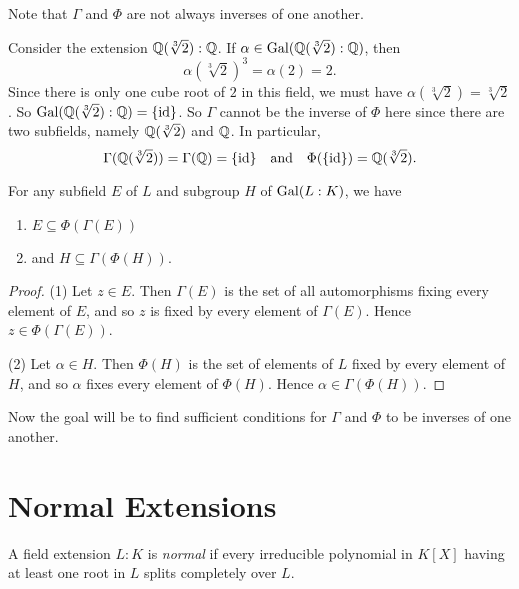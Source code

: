 \begin{remark}
  Note that $\Gamma$ and $\Phi$ are not always
  inverses of one another.
\end{remark}

\begin{example}
  Consider the extension $\mathbb{Q}(\sqrt[3]{2}) : \mathbb{Q}$.
  If $\alpha \in \operatorname{Gal}(\mathbb{Q}(\sqrt[3]{2}) : \mathbb{Q})$, then
  \[
    \alpha(\sqrt[3]{2})^3 = \alpha(2) = 2.
  \]
  Since there is only one cube root of $2$ in this
  field, we must have $\alpha(\sqrt[3]{2}) = \sqrt[3]{2}$.
  So $\operatorname{Gal}(\mathbb{Q}(\sqrt[3]{2}) : \mathbb{Q}) = \{\mathrm{id}\}$. So
  $\Gamma$ cannot be the inverse of $\Phi$ here since
  there are two subfields, namely $\mathbb{Q}(\sqrt[3]{2})$
  and $\mathbb{Q}$. In particular,
  \[
    \Gamma(\mathbb{Q}(\sqrt[3]{2})) = \Gamma(\mathbb{Q}) = \{\mathrm{id}\}
    \quad \text{and} \quad
    \Phi(\{\mathrm{id}\}) = \mathbb{Q}(\sqrt[3]{2}).
  \]
\end{example}

\begin{theorem}
  For any subfield $E$ of $L$ and subgroup $H$ of $\operatorname{Gal}(L : K)$, we have
  \begin{enumerate}
    \item $E \subseteq \Phi(\Gamma(E))$
    \item and $H \subseteq \Gamma(\Phi(H))$.
  \end{enumerate}
\end{theorem}

\begin{proof}
  (1) Let $z \in E$. Then $\Gamma(E)$ is the set of
  all automorphisms fixing every element of $E$, and so
  $z$ is fixed by every element of $\Gamma(E)$.
  Hence $z \in \Phi(\Gamma(E))$.

  (2) Let $\alpha \in H$. Then $\Phi(H)$ is the set
  of elements of $L$ fixed by every element of $H$, and
  so $\alpha$ fixes every element of $\Phi(H)$.
  Hence $\alpha \in \Gamma(\Phi(H))$.
\end{proof}

\begin{remark}
  Now the goal will be to find sufficient conditions
  for $\Gamma$ and $\Phi$ to be inverses of one another.
\end{remark}

\section{Normal Extensions}

\begin{definition}
  A field extension $L : K$ is \emph{normal} if every
  irreducible polynomial in $K[X]$ having at least
  one root in $L$ splits completely over $L$.
\end{definition}

